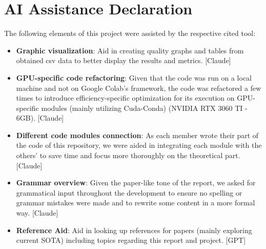 \documentclass[10pt,twocolumn,letterpaper]{article}
\begin{document}
\section*{AI Assistance Declaration}
\label{sec:ai_declaration}
The following elements of this project were assisted by the respective cited tool:
\begin{itemize}
    \item \textbf{Graphic visualization}: Aid in creating quality graphs and tables from obtained csv data to better display the results and metrics. [Claude]
    \item \textbf{GPU-specific code refactoring}: Given that the code was run on a local machine and not on Google Colab's framework, the code was refactored a few times to introduce efficiency-specific optimization for its execution on GPU-specific modules (mainly utilizing Cuda-Conda) (NVIDIA RTX 3060 TI - 6GB). [Claude]
    \item \textbf{Different code modules connection}: As each member wrote their part of the code of this repository, we were aided in integrating each module with the others' to save time and focus more thoroughly on the theoretical part. [Claude]
    \item \textbf{Grammar overview}: Given the paper-like tone of the report, we asked for grammatical input throughout the development to ensure no spelling or grammar mistakes were made and to rewrite some content in a more formal way. [Claude]
    \item \textbf{Reference Aid}: Aid in looking up references for papers (mainly exploring current SOTA) including topics regarding this report and project. [GPT]
\end{itemize}

{\small


}
\end{document}
